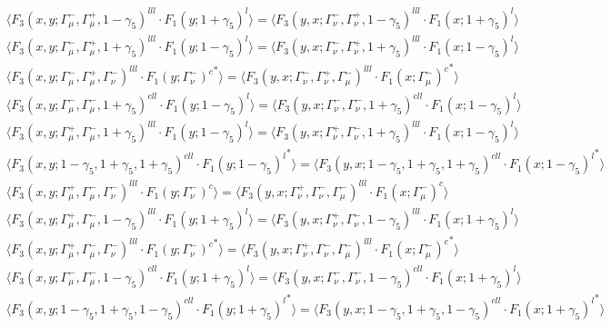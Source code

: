 \begin{align*}
&\Big\langle F_3(x,y;\Gamma_\mu^-,\Gamma_\mu^+,1-\gamma_5)^{lll} \cdot F_1(y;1+\gamma_5)^l\Big\rangle
=\Big\langle F_3(y,x;\Gamma_\nu^-,\Gamma_\nu^+,1-\gamma_5)^{lll} \cdot F_1(x;1+\gamma_5)^l\Big\rangle\\
&\Big\langle F_3(x,y;\Gamma_\mu^-,\Gamma_\mu^+,1+\gamma_5)^{lll} \cdot F_1(y;1-\gamma_5)^l\Big\rangle
=\Big\langle F_3(y,x;\Gamma_\nu^-,\Gamma_\nu^+,1+\gamma_5)^{lll} \cdot F_1(x;1-\gamma_5)^l\Big\rangle\\
&\Big\langle F_3(x,y;\Gamma_\mu^-,\Gamma_\mu^+,\Gamma_\nu^-)^{lll} \cdot {F_1(y;\Gamma_\nu^-)^c}^*\Big\rangle
=\Big\langle F_3(y,x;\Gamma_\nu^-,\Gamma_\nu^+,\Gamma_\mu^-)^{lll} \cdot {F_1(x;\Gamma_\mu^-)^c}^*\Big\rangle\\
&\Big\langle F_3(x,y;\Gamma_\mu^-,\Gamma_\mu^-,1+\gamma_5)^{cll} \cdot F_1(y;1-\gamma_5)^l\Big\rangle
=\Big\langle F_3(y,x;\Gamma_\nu^-,\Gamma_\nu^-,1+\gamma_5)^{cll} \cdot F_1(x;1-\gamma_5)^l\Big\rangle\\
&\Big\langle F_3(x,y;\Gamma_\mu^+,\Gamma_\mu^-,1+\gamma_5)^{lll} \cdot F_1(y;1-\gamma_5)^l\Big\rangle
=\Big\langle F_3(y,x;\Gamma_\nu^+,\Gamma_\nu^-,1+\gamma_5)^{lll} \cdot F_1(x;1-\gamma_5)^l\Big\rangle\\
&\Big\langle F_3(x,y;1-\gamma_5,1+\gamma_5,1+\gamma_5)^{cll} \cdot {F_1(y;1-\gamma_5)^l}^*\Big\rangle
=\Big\langle F_3(y,x;1-\gamma_5,1+\gamma_5,1+\gamma_5)^{cll} \cdot {F_1(x;1-\gamma_5)^l}^*\Big\rangle\\
&\Big\langle F_3(x,y;\Gamma_\mu^+,\Gamma_\mu^-,\Gamma_\nu^-)^{lll} \cdot F_1(y;\Gamma_\nu^-)^c\Big\rangle
=\Big\langle F_3(y,x;\Gamma_\nu^+,\Gamma_\nu^-,\Gamma_\mu^-)^{lll} \cdot F_1(x;\Gamma_\mu^-)^c\Big\rangle\\
&\Big\langle F_3(x,y;\Gamma_\mu^+,\Gamma_\mu^-,1-\gamma_5)^{lll} \cdot F_1(y;1+\gamma_5)^l\Big\rangle
=\Big\langle F_3(y,x;\Gamma_\nu^+,\Gamma_\nu^-,1-\gamma_5)^{lll} \cdot F_1(x;1+\gamma_5)^l\Big\rangle\\
&\Big\langle F_3(x,y;\Gamma_\mu^+,\Gamma_\mu^-,\Gamma_\nu^-)^{lll} \cdot {F_1(y;\Gamma_\nu^-)^c}^*\Big\rangle
=\Big\langle F_3(y,x;\Gamma_\nu^+,\Gamma_\nu^-,\Gamma_\mu^-)^{lll} \cdot {F_1(x;\Gamma_\mu^-)^c}^*\Big\rangle\\
&\Big\langle F_3(x,y;\Gamma_\mu^-,\Gamma_\mu^-,1-\gamma_5)^{cll} \cdot F_1(y;1+\gamma_5)^l\Big\rangle
=\Big\langle F_3(y,x;\Gamma_\nu^-,\Gamma_\nu^-,1-\gamma_5)^{cll} \cdot F_1(x;1+\gamma_5)^l\Big\rangle\\
&\Big\langle F_3(x,y;1-\gamma_5,1+\gamma_5,1-\gamma_5)^{cll} \cdot {F_1(y;1+\gamma_5)^l}^*\Big\rangle
=\Big\langle F_3(y,x;1-\gamma_5,1+\gamma_5,1-\gamma_5)^{cll} \cdot {F_1(x;1+\gamma_5)^l}^*\Big\rangle\\
\end{align*}
